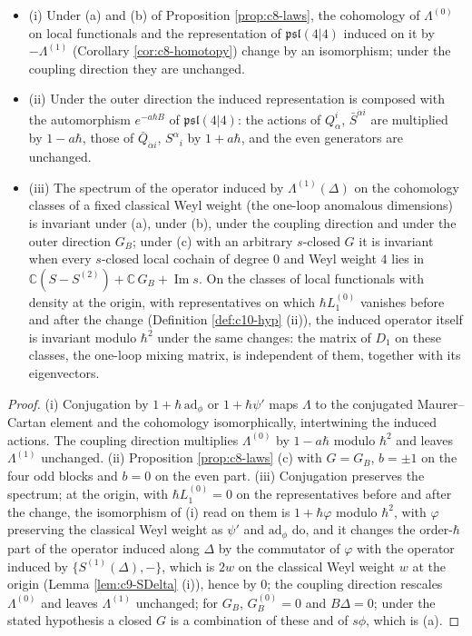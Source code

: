 \begin{theorem}
\label{thm:c8-invariants}
\begin{itemize}
\item (i) Under (a) and (b) of Proposition \ref{prop:c8-laws}, the cohomology of $\Lambda^{(0)}$ on local functionals and the representation of $\mathfrak{psl}(4|4)$ induced on it by $-\Lambda^{(1)}$ (Corollary \ref{cor:c8-homotopy}) change by an isomorphism; under the coupling direction they are unchanged.
\item (ii) Under the outer direction the induced representation is composed with the automorphism $e^{-a\hbar B}$ of $\mathfrak{psl}(4|4)$: the actions of $Q^i_\alpha$, $\bar S^{\dot\alpha i}$ are multiplied by $1-a\hbar$, those of $\bar Q_{\dot\alpha i}$, $S^\alpha{}_i$ by $1+a\hbar$, and the even generators are unchanged.
\item (iii) The spectrum of the operator induced by $\Lambda^{(1)}(\Delta)$ on the cohomology classes of a fixed classical Weyl weight (the one-loop anomalous dimensions) is invariant under (a), under (b), under the coupling direction and under the outer direction $G_B$; under (c) with an arbitrary $s$-closed $G$ it is invariant when every $s$-closed local cochain of degree $0$ and Weyl weight $4$ lies in $\mathbb C(S-S^{(2)})+\mathbb C\,G_B+\operatorname{Im}s$. On the classes of local functionals with density at the origin, with representatives on which $\hbar L_1^{(0)}$ vanishes before and after the change (Definition \ref{def:c10-hyp} (ii)), the induced operator itself is invariant modulo $\hbar^2$ under the same changes: the matrix of $D_1$ on these classes, the one-loop mixing matrix, is independent of them, together with its eigenvectors.
\end{itemize}
\end{theorem}

\begin{proof}
(i) Conjugation by $1+\hbar\,\mathrm{ad}_\phi$ or $1+\hbar\psi'$ maps $\Lambda$ to the conjugated Maurer--Cartan element and the cohomology isomorphically, intertwining the induced actions. The coupling direction multiplies $\Lambda^{(0)}$ by $1-a\hbar$ modulo $\hbar^2$ and leaves $\Lambda^{(1)}$ unchanged. (ii) Proposition \ref{prop:c8-laws} (c) with $G=G_B$, $b=\pm1$ on the four odd blocks and $b=0$ on the even part. (iii) Conjugation preserves the spectrum; at the origin, with $\hbar L_1^{(0)}=0$ on the representatives before and after the change, the isomorphism of (i) read on them is $1+\hbar\varphi$ modulo $\hbar^2$, with $\varphi$ preserving the classical Weyl weight as $\psi'$ and $\mathrm{ad}_\phi$ do, and it changes the order-$\hbar$ part of the operator induced along $\Delta$ by the commutator of $\varphi$ with the operator induced by $\{S^{(1)}(\Delta),-\}$, which is $2w$ on the classical Weyl weight $w$ at the origin (Lemma \ref{lem:c9-SDelta} (i)), hence by $0$; the coupling direction rescales $\Lambda^{(0)}$ and leaves $\Lambda^{(1)}$ unchanged; for $G_B$, $G_B^{(0)}=0$ and $B\Delta=0$; under the stated hypothesis a closed $G$ is a combination of these and of $s\phi$, which is (a).
\end{proof}

